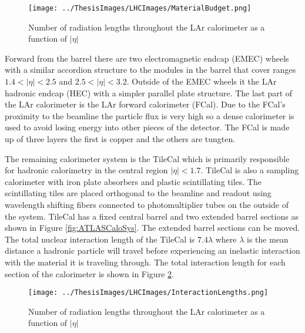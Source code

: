 \begin{figure}[h!]
	\centering
	\texttt{[image: ../ThesisImages/LHCImages/MaterialBudget.png]}
	\caption[Number of radiation lengths throughout the LAr calorimeter as a function of $|\eta|$]{Number of radiation lengths throughout the LAr calorimeter as a function of $|\eta|$\cite{ATLAS}
	}
	\label{fig:MaterialBudget}
\end{figure}

Forward from the barrel there are two electromagnetic endcap (EMEC) wheels with a similar accordion structure to the modules in the barrel that cover ranges $1.4<|\eta|<2.5$ and $2.5<|\eta|<3.2$.  Outside of the EMEC wheels it the LAr hadronic endcap (HEC) with a simpler parallel plate structure.  The last part of the LAr calorimeter is the LAr forward calorimeter (FCal).  Due to the FCal's proximity to the beamline the particle flux is very high so a dense calorimeter is used to avoid losing energy into other pieces of the detector.  The FCal is made up of three layers the first is copper and the others are tungten.  

The remaining calorimeter system is the TileCal which is primarily responsible for hadronic calorimetry in the central region $|\eta|<1.7$.  TileCal is also a sampling calorimeter with iron plate absorbers and plastic scintillating tiles. The scintillating tiles are placed orthogonal to the beamline and readout using wavelength shifting fibers connected to photomultiplier tubes on the outside of the system.  TileCal has a fixed central barrel and two extended barrel sections as shown in Figure \ref{fig:ATLASCaloSys}.  The extended barrel sections can be moved.  The total nuclear interaction length of the TileCal is $7.4\lambda$ where $\lambda$ is the mean distance a hadronic particle will travel before experiencing an inelastic interaction with the material it is traveling through.  The total interaction length for each section of the calorimeter is shown in Figure \ref{fig:InteractionLengths}.


\begin{figure}[h!]
	\centering
	\texttt{[image: ../ThesisImages/LHCImages/InteractionLengths.png]}
	\caption[Number of interaction lengths throughout the LAr calorimeter as a function of $|\eta|$]{Number of radiation lengths throughout the LAr calorimeter as a function of $|\eta|$\cite{ATLAS}
	}
	\label{fig:InteractionLengths}
\end{figure}


